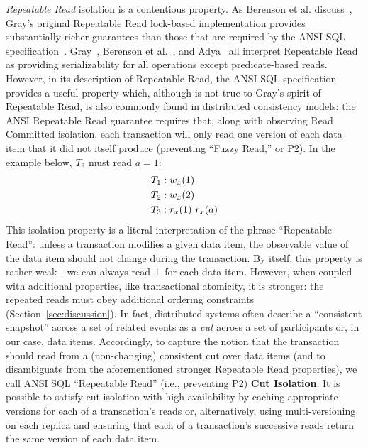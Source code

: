 \textit{Repeatable Read} isolation is a contentious property. As
Berenson et al. discuss~\cite{ansicritique}, Gray's original
Repeatable Read lock-based implementation provides substantially
richer guarantees than those that are required by the ANSI SQL
specification~\cite{gray-isolation}. Gray~\cite{gray-isolation},
Berenson et al.~\cite{ansicritique}, and Adya~\cite{adya} all
interpret Repeatable Read as providing serializability for all
operations except predicate-based reads. However, in its description
of Repeatable Read, the ANSI SQL specification provides a useful
property which, although is not true to Gray's spirit of Repeatable
Read, is also commonly found in distributed consistency models: the
ANSI Repeatable Read guarantee requires that, along with observing
Read Committed isolation, each transaction will only read one version
of each data item that it did not itself produce (preventing ``Fuzzy
Read,'' or P2). In the example below, $T_3$ must read $a=1$:
\begin{align*}
\small
T_1 &: w_x(1)
\\T_2 &: w_x(2)
\\T_3 &: r_x(1)~r_x(a)
\end{align*}
This isolation property is a literal interpretation of the phrase
``Repeatable Read'': unless a transaction modifies a given data item,
the observable value of the data item should not change during the
transaction. By itself, this property is rather weak---we can always
read $\bot$ for each data item. However, when coupled with additional
properties, like transactional atomicity, it is stronger: the repeated
reads must obey additional ordering constraints
(Section~\ref{sec:discussion}). In fact, distributed systems often
describe a ``consistent snapshot'' across a set of related events as a
\textit{cut} across a set of participants or, in our case, data
items. Accordingly, to capture the notion that the transaction should
read from a (non-changing) consistent cut over data items (and to
disambiguate from the aforementioned stronger Repeatable Read
properties), we call ANSI SQL ``Repeatable Read'' (i.e., preventing
P2) \textbf{Cut Isolation}. It is possible to satisfy cut isolation
with high availability by caching appropriate versions for each of a
transaction's reads or, alternatively, using multi-versioning on each
replica and ensuring that each of a transaction's successive reads
return the same version of each data item.

